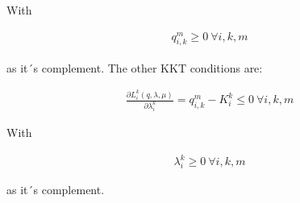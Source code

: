 \documentclass[a4paper,12pt]{article}
\theoremstyle{remark}
\begin{document}
With

\begin{gather}
q_{i,k}^m \geq 0 \ \forall i,k,m
\end{gather}

as it´s complement.
The other KKT conditions are:

\begin{gather}
\frac{\partial L_i^k(q,\lambda,\mu)}{\partial \lambda_i^k}	= q_{i,k}^m-K_i^k \leq 0 \ \forall i,k,m
\end{gather}

With 

\begin{gather}
\lambda_i^k \geq 0 \  \forall i,k,m
\end{gather}

as it´s complement.
\end{document}
